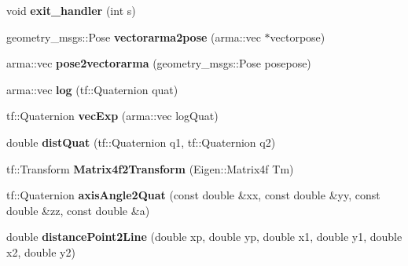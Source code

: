 \begin{DoxyCompactItemize}
\item 
\hypertarget{namespacekukadu_a0f5a68a4b2aefd3d894a0235664ac5e5}{void {\bfseries exit\-\_\-handler} (int s)}\label{namespacekukadu_a0f5a68a4b2aefd3d894a0235664ac5e5}

\item 
\hypertarget{namespacekukadu_af4b115434fc557d1a59c92930043bf99}{geometry\-\_\-msgs\-::\-Pose {\bfseries vectorarma2pose} (arma\-::vec $\ast$vectorpose)}\label{namespacekukadu_af4b115434fc557d1a59c92930043bf99}

\item 
\hypertarget{namespacekukadu_a5d082f90195542c29ee20a98405dbe31}{arma\-::vec {\bfseries pose2vectorarma} (geometry\-\_\-msgs\-::\-Pose posepose)}\label{namespacekukadu_a5d082f90195542c29ee20a98405dbe31}

\item 
\hypertarget{namespacekukadu_afa6b425e55df9de457d99c40faad535d}{arma\-::vec {\bfseries log} (tf\-::\-Quaternion quat)}\label{namespacekukadu_afa6b425e55df9de457d99c40faad535d}

\item 
\hypertarget{namespacekukadu_a537c94326e5aafb4c5199c7026155621}{tf\-::\-Quaternion {\bfseries vec\-Exp} (arma\-::vec log\-Quat)}\label{namespacekukadu_a537c94326e5aafb4c5199c7026155621}

\item 
\hypertarget{namespacekukadu_a018eda78a059f23e3bc945b10d2e3cfc}{double {\bfseries dist\-Quat} (tf\-::\-Quaternion q1, tf\-::\-Quaternion q2)}\label{namespacekukadu_a018eda78a059f23e3bc945b10d2e3cfc}

\item 
\hypertarget{namespacekukadu_acf90cbb6df534c52bb47691360c3fad3}{tf\-::\-Transform {\bfseries Matrix4f2\-Transform} (Eigen\-::\-Matrix4f Tm)}\label{namespacekukadu_acf90cbb6df534c52bb47691360c3fad3}

\item 
\hypertarget{namespacekukadu_a380906e9d4452baf8a8ba8d6dd2495f6}{tf\-::\-Quaternion {\bfseries axis\-Angle2\-Quat} (const double \&xx, const double \&yy, const double \&zz, const double \&a)}\label{namespacekukadu_a380906e9d4452baf8a8ba8d6dd2495f6}

\item 
\hypertarget{namespacekukadu_a228221f75f3f3f319b2d957be2308935}{double {\bfseries distance\-Point2\-Line} (double xp, double yp, double x1, double y1, double x2, double y2)}\label{namespacekukadu_a228221f75f3f3f319b2d957be2308935}


\end{DoxyCompactItemize}
